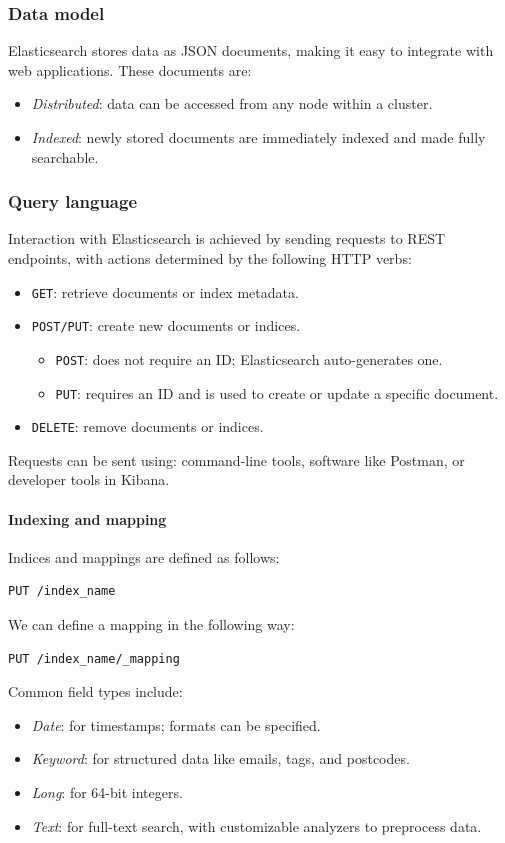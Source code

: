 \subsubsection{Data model}
Elasticsearch stores data as JSON documents, making it easy to integrate with web applications. These documents are:
\begin{itemize}
    \item \textit{Distributed}: data can be accessed from any node within a cluster.
    \item \textit{Indexed}: newly stored documents are immediately indexed and made fully searchable.
\end{itemize}


\subsubsection{Query language}
Interaction with Elasticsearch is achieved by sending requests to REST endpoints, with actions determined by the following HTTP verbs:
\begin{itemize}
    \item \texttt{GET}: retrieve documents or index metadata.
    \item \texttt{POST/PUT}: create new documents or indices.
        \begin{itemize}
            \item \texttt{POST}: does not require an ID; Elasticsearch auto-generates one.
            \item \texttt{PUT}: requires an ID and is used to create or update a specific document.
        \end{itemize}
    \item \texttt{DELETE}: remove documents or indices.
\end{itemize}
Requests can be sent using: command-line tools, software like Postman, or developer tools in Kibana. 

\paragraph*{Indexing and mapping}
Indices and mappings are defined as follows:
\begin{lstlisting}[style=C]
PUT /index_name
\end{lstlisting} 
We can define a mapping in the following way: 
\begin{lstlisting}[style=C]
PUT /index_name/_mapping
\end{lstlisting} 
Common field types include:
\begin{itemize}
    \item \textit{Date}: for timestamps; formats can be specified.
    \item \textit{Keyword}: for structured data like emails, tags, and postcodes.
    \item \textit{Long}: for 64-bit integers.
    \item \textit{Text}: for full-text search, with customizable analyzers to preprocess data.
\end{itemize}


